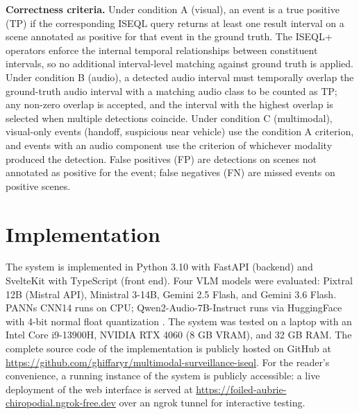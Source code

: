 \textbf{Correctness criteria.} Under condition A (visual), an event is a true positive (TP) if the corresponding ISEQL query returns at least one result interval on a scene annotated as positive for that event in the ground truth. The ISEQL+ operators enforce the internal temporal relationships between constituent intervals, so no additional interval-level matching against ground truth is applied. Under condition B (audio), a detected audio interval must temporally overlap the ground-truth audio interval with a matching audio class to be counted as TP; any non-zero overlap is accepted, and the interval with the highest overlap is selected when multiple detections coincide. Under condition C (multimodal), visual-only events (handoff, suspicious near vehicle) use the condition A criterion, and events with an audio component use the criterion of whichever modality produced the detection. False positives (FP) are detections on scenes not annotated as positive for the event; false negatives (FN) are missed events on positive scenes.

\section{Implementation}

The system is implemented in Python 3.10 with FastAPI (backend) and SvelteKit with TypeScript (front end). Four VLM models were evaluated: Pixtral 12B (Mistral API), Ministral 3-14B, Gemini 2.5 Flash, and Gemini 3.6 Flash. PANNs CNN14 runs on CPU; Qwen2-Audio-7B-Instruct runs via HuggingFace with 4-bit normal float quantization \citep{dettmers2024qlora}. The system was tested on a laptop with an Intel Core i9-13900H, NVIDIA RTX 4060 (8 GB VRAM), and 32 GB RAM. The complete source code of the implementation is publicly hosted on GitHub at \url{https://github.com/ghiffaryr/multimodal-surveillance-iseql}. For the reader's convenience, a running instance of the system is publicly accessible: a live deployment of the web interface is served at \href{https://foiled-aubrie-chiropodial.ngrok-free.dev}{https://foiled-aubrie-chiropodial.ngrok-free.dev} over an ngrok tunnel for interactive testing.

